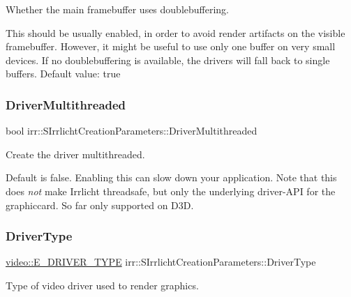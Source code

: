 Whether the main framebuffer uses doublebuffering. 

This should be usually enabled, in order to avoid render artifacts on the visible framebuffer. However, it might be useful to use only one buffer on very small devices. If no doublebuffering is available, the drivers will fall back to single buffers. Default value\+: true \mbox{\label{structirr_1_1SIrrlichtCreationParameters_a0b05e1ad03575edb74f625180860072d}} 
\subsubsection{\texorpdfstring{Driver\+Multithreaded}{DriverMultithreaded}}
{\footnotesize\ttfamily bool irr\+::\+S\+Irrlicht\+Creation\+Parameters\+::\+Driver\+Multithreaded}



Create the driver multithreaded. 

Default is false. Enabling this can slow down your application. Note that this does {\itshape not} make Irrlicht threadsafe, but only the underlying driver-\/\+A\+PI for the graphiccard. So far only supported on D3D. \mbox{\label{structirr_1_1SIrrlichtCreationParameters_a1ea2f50c3b3a8eed6602a1a86e1cdf82}} 
\subsubsection{\texorpdfstring{Driver\+Type}{DriverType}}
{\footnotesize\ttfamily \hyperlink{namespaceirr_1_1video_ae35a6de6d436c76107ad157fe42356d0}{video\+::\+E\+\_\+\+D\+R\+I\+V\+E\+R\+\_\+\+T\+Y\+PE} irr\+::\+S\+Irrlicht\+Creation\+Parameters\+::\+Driver\+Type}



Type of video driver used to render graphics. 

